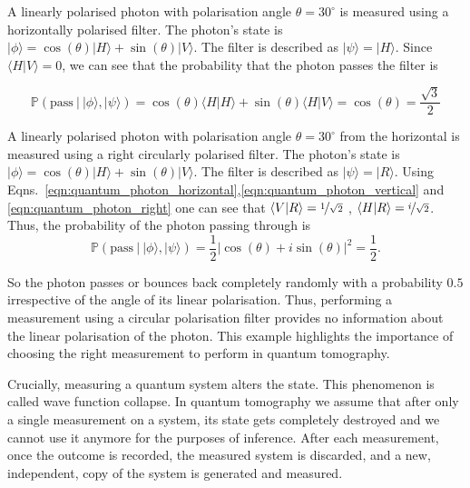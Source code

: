 \begin{example}
A linearly polarised photon with polarisation angle $\theta = 30^{\circ}$	 is measured using a horizontally polarised filter. The photon's state is $\vert\phi\rangle = \cos(\theta)\vert H \rangle + \sin(\theta)\vert V \rangle$. The filter is described as $\vert\psi\rangle = \vert H \rangle$. Since $\langle H \vert V \rangle = 0$, we can see that the probability that the photon passes the filter is

\begin{equation}
	\mathbb{P}\left( \mbox{pass}\ \vert\ \vert\phi\rangle , \vert\psi\rangle \right) = \cos(\theta)\langle H \vert H \rangle + \sin(\theta) \langle H \vert V \rangle = \cos(\theta) = \frac{\sqrt{3}}{2}
\end{equation}\end{example}

\begin{example}
A linearly polarised photon with polarisation angle $\theta = 30^{\circ}$ from the horizontal is measured using a right circularly polarised filter. The photon's state is $\vert\phi\rangle = \cos(\theta)\vert H \rangle + \sin(\theta)\vert V \rangle$. The filter is described as $\vert\psi\rangle = \vert R \rangle$. Using Eqns.\ \eqref{eqn:quantum_photon_horizontal},\eqref{eqn:quantum_photon_vertical} and \eqref{eqn:quantum_photon_right} one can see that $\langle V \vert R \rangle = \nicefrac{1}{\sqrt{2}}$ , $\langle H \vert R \rangle = \nicefrac{i}{\sqrt{2}}$. Thus, the probability of the photon passing through is
\begin{equation}
	\mathbb{P}\left( \mbox{pass}\ \vert\ \vert\phi\rangle , \vert\psi\rangle \right) = \frac{1}{2}\left\vert\cos(\theta) + i\sin(\theta)\right\vert^2 = \frac{1}{2}.
\end{equation}

So the photon passes or bounces back completely randomly with a probability $0.5$ irrespective of the angle of its linear polarisation. Thus, performing a measurement using a circular polarisation filter provides no information about the linear polarisation of the photon. This example highlights the importance of choosing the right measurement to perform in quantum tomography.
\end{example}

Crucially, measuring a quantum system alters the state.	This phenomenon is called wave function collapse. In quantum tomography we assume that after only a single measurement on a system, its state gets completely destroyed and we cannot use it anymore for the purposes of inference. After each measurement, once the outcome is recorded, the measured system is discarded, and a new, independent, copy of the system is generated and measured.

